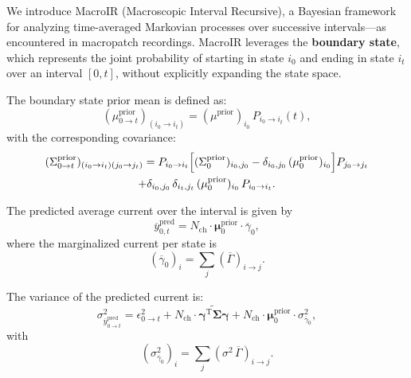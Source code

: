 \documentclass[pdflatex,sn-nature]{sn-jnl}%
\theoremstyle{thmstyleone}%
\theoremstyle{thmstyletwo}%
\theoremstyle{thmstylethree}%
\begin{document}
We introduce MacroIR (Macroscopic Interval Recursive), a Bayesian framework for analyzing time-averaged Markovian processes over successive intervals—as encountered in macropatch recordings. MacroIR leverages the \textbf{boundary state}, which represents the joint probability of starting in state \(i_0\) and ending in state \(i_t\) over an interval \([0,t]\), without explicitly expanding the state space.

The boundary state prior mean is defined as:
\begin{equation}
	(\mu^{\text{prior}}_{0 \rightarrow t})_{(i_0 \rightarrow i_t)} = (\mu^{\text{prior}})_{i_0} \, P_{i_0 \rightarrow i_t}(t),
	\label{eq:boundary_mean_prior}
\end{equation}
with the corresponding covariance:
\begin{multline}
	(\Sigma^{\text{prior}}_{0 \rightarrow t})_{(i_0 \rightarrow i_t)(j_0 \rightarrow j_t)} = P_{i_0 \rightarrow i_t}\Bigl[(\Sigma^{\text{prior}}_0)_{i_0,j_0} - \delta_{i_0,j_0}\, (\mu^{\text{prior}}_0)_{i_0}\Bigr] P_{j_0 \rightarrow j_t} \\
	+ \delta_{i_0,j_0}\,\delta_{i_t,j_t}\, (\mu^{\text{prior}}_0)_{i_0}\, P_{i_0 \rightarrow i_t}.
	\label{eq:boundary_covariance_prior}
\end{multline}

The predicted average current over the interval is given by
\begin{equation}
	\overline{y}^{\text{pred}}_{0,t} = N_{\text{ch}} \cdot \mathbf{\mu}^{\text{prior}}_{0} \cdot \overline{\gamma}_{0},
	\label{eq:macro_interval_predicted_y}
\end{equation}
where the marginalized current per state is
\begin{equation}
	(\overline{\gamma}_{0})_i = \sum_j (\overline{\Gamma})_{i \rightarrow j}.
\end{equation}

The variance of the predicted current is:
\begin{equation}
	\sigma^2_{\overline{y}^{\text{pred}}_{0 \rightarrow t}} = \epsilon^2_{0 \rightarrow t} + N_{\text{ch}} \cdot \widetilde{\mathbf{\gamma}^{\mathrm{T}} \mathbf{\Sigma}\mathbf{\gamma}} + N_{\text{ch}} \cdot \mathbf{\mu}^{\text{prior}}_{0} \cdot \sigma^2_{\overline{\gamma}_{0}},
	\label{eq:macro_interval_sigma_pred}
\end{equation}
with
\begin{equation}
	(\sigma^2_{\overline{\gamma}_{0}})_i = \sum_j (\sigma^2\,\overline{\Gamma})_{i \rightarrow j}.
\end{equation}
\end{document}

